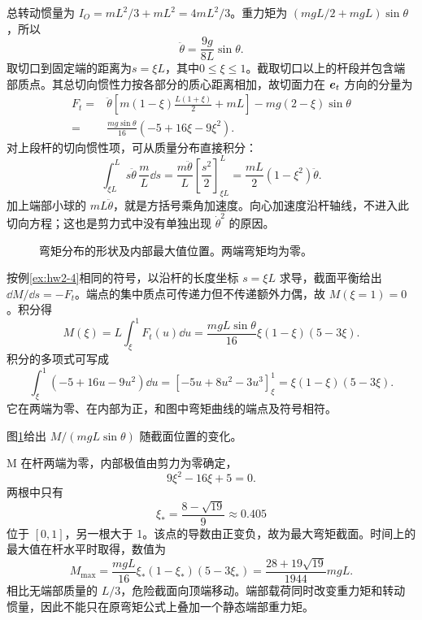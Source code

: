 \begin{solution}
总转动惯量为 $I_O=mL^2/3+mL^2=4mL^2/3$。重力矩为 $(mgL/2+mgL)\sin\theta$，所以
\[
\ddot\theta=\frac{9g}{8L}\sin\theta.
\]
取切口到固定端的距离为$s=\xi L$，其中$0\le\xi\le1$。截取切口以上的杆段并包含端部质点。其总切向惯性力按各部分的质心距离相加，故切面力在 $\bm{e}_t$ 方向的分量为
\begin{align*}
F_t={}&\ddot\theta\left[m(1-\xi)\frac{L(1+\xi)}2+mL\right]
-mg(2-\xi)\sin\theta\\
={}&\frac{mg\sin\theta}{16}(-5+16\xi-9\xi^2).
\end{align*}
对上段杆的切向惯性项，可从质量分布直接积分：
\[
\int_{\xi L}^{L}s\ddot\theta\,\frac mL\dd s
=\frac{m\ddot\theta}L\left[\frac{s^2}2\right]_{\xi L}^{L}
=\frac{mL}{2}(1-\xi^2)\ddot\theta.
\]
加上端部小球的 $mL\ddot\theta$，就是方括号乘角加速度。向心加速度沿杆轴线，不进入此切向方程；这也是剪力式中没有单独出现 $\dot\theta^2$ 的原因。

\begin{figure}[H]\centering
{}
\caption{弯矩分布的形状及内部最大值位置。两端弯矩均为零。}\label{deep2:fig:d2-h7-s}
\end{figure}

按例\ref{ex:hw2-4}相同的符号，以沿杆的长度坐标 $s=\xi L$ 求导，截面平衡给出 $\dd M/\dd s=-F_t$。端点的集中质点可传递力但不传递额外力偶，故 $M(\xi=1)=0$。积分得
\[
M(\xi)=L\int_\xi^1F_t(u)\dd u
=\frac{mgL\sin\theta}{16}\xi(1-\xi)(5-3\xi).
\]
积分的多项式可写成
\[
\int_\xi^1(-5+16u-9u^2)\dd u
=[-5u+8u^2-3u^3]_\xi^1
=\xi(1-\xi)(5-3\xi).
\]
它在两端为零、在内部为正，和图中弯矩曲线的端点及符号相符。

图\ref{deep2:fig:d2-h7-s}给出 $M/(mgL\sin\theta)$ 随截面位置的变化。

M 在杆两端为零，内部极值由剪力为零确定，
\[
9\xi^2-16\xi+5=0.
\]
两根中只有
\[
\xi_* =\frac{8-\sqrt{19}}9\approx0.405
\]
位于 $[0,1]$，另一根大于 1。该点的导数由正变负，故为最大弯矩截面。时间上的最大值在杆水平时取得，数值为
\[
M_{\max}=\frac{mgL}{16}\xi_*(1-\xi_*)(5-3\xi_*)
=\frac{28+19\sqrt{19}}{1944}mgL.
\]
相比无端部质量的 $L/3$，危险截面向顶端移动。端部载荷同时改变重力矩和转动惯量，因此不能只在原弯矩公式上叠加一个静态端部重力矩。

\end{solution}


